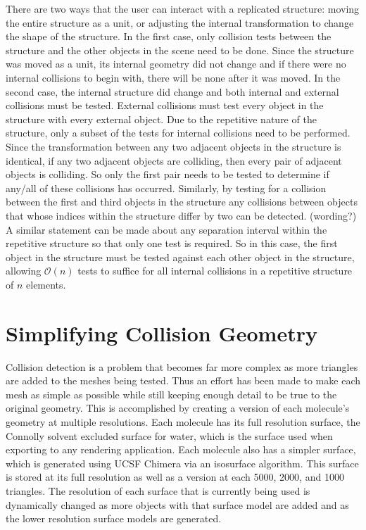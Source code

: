 \documentclass{article} %
\begin{document}
There are two ways that the user can interact with a replicated structure: moving the entire structure as a unit, or adjusting the internal transformation to change the shape of the structure.  In the first case, only collision tests between the structure and the other objects in the scene need to be done.  Since the structure was moved as a unit, its internal geometry did not change and if there were no internal collisions to begin with, there will be none after it was moved.  In the second case, the internal structure did change and both internal and external collisions must be tested.  External collisions must test every object in the structure with every external object.   Due to the repetitive nature of the structure, only a subset of the tests for internal collisions need to be performed.  Since the transformation between any two adjacent objects in the structure is identical, if any two adjacent objects are colliding, then every pair of adjacent objects is colliding.  So only the first pair needs to be tested to determine if any/all of these collisions has occurred.  Similarly, by testing for a collision between the first and third objects in the structure any collisions between objects that whose indices within the structure differ by two can be detected. (wording?)  A similar statement can be made about any separation interval within the repetitive structure so that only one test is required.  So in this case, the first object in the structure must be tested against each other object in the structure, allowing $\mathcal{O}(n)$ tests to suffice for all internal collisions in a repetitive structure of $n$ elements.

\section{Simplifying Collision Geometry}

Collision detection is a problem that becomes far more complex as more triangles are added to the meshes being tested.  Thus an effort has been made to make each mesh as simple as possible while still keeping enough detail to be true to the original geometry.  This is accomplished by creating a version of each molecule's geometry at multiple resolutions.  Each molecule has its full resolution surface, the Connolly solvent excluded surface for water, which is the surface used when exporting to any rendering application.  Each molecule also has a simpler surface, which is generated using UCSF Chimera via an isosurface algorithm.  This surface is stored at its full resolution as well as a version at each 5000, 2000, and 1000 triangles.  The resolution of each surface that is currently being used is dynamically changed as more objects with that surface model are added and as the lower resolution surface models are generated.
\end{document}
